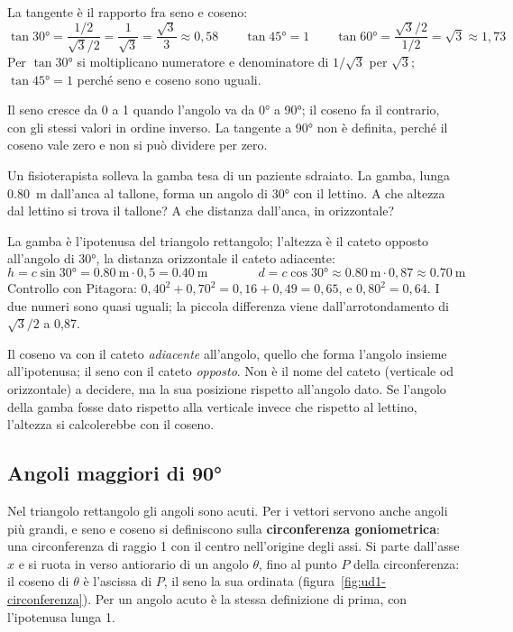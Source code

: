 La tangente è il rapporto fra seno e coseno:
\[
  \tan\ang{30} = \frac{1/2}{\sqrt 3/2} = \frac{1}{\sqrt 3} = \frac{\sqrt 3}{3} \approx 0{,}58
  \qquad
  \tan\ang{45} = 1
  \qquad
  \tan\ang{60} = \frac{\sqrt 3/2}{1/2} = \sqrt 3 \approx 1{,}73
\]
Per $\tan\ang{30}$ si moltiplicano numeratore e denominatore di $1/\sqrt 3$ per $\sqrt 3$; $\tan\ang{45} = 1$ perché seno e coseno sono uguali.

Il seno cresce da 0 a 1 quando l'angolo va da \ang{0} a \ang{90}; il coseno fa il contrario, con gli stessi valori in ordine inverso. La tangente a \ang{90} non è definita, perché il coseno vale zero e non si può dividere per zero.

\begin{esempio}
Un fisioterapista solleva la gamba tesa di un paziente sdraiato. La gamba, lunga \SI{0,80}{\metre} dall'anca al tallone, forma un angolo di \ang{30} con il lettino. A che altezza dal lettino si trova il tallone? A che distanza dall'anca, in orizzontale?

La gamba è l'ipotenusa del triangolo rettangolo; l'altezza è il cateto opposto all'angolo di \ang{30}, la distanza orizzontale il cateto adiacente:
\[
  h = c \sin\ang{30} = \SI{0,80}{\metre} \cdot 0{,}5 = \SI{0,40}{\metre}
  \qquad\qquad
  d = c \cos\ang{30} \approx \SI{0,80}{\metre} \cdot 0{,}87 \approx \SI{0,70}{\metre}
\]
Controllo con Pitagora: $0{,}40^{2} + 0{,}70^{2} = 0{,}16 + 0{,}49 = 0{,}65$, e $0{,}80^{2} = 0{,}64$. I due numeri sono quasi uguali; la piccola differenza viene dall'arrotondamento di $\sqrt 3/2$ a 0,87.
\end{esempio}

\begin{attenzione}
Il coseno va con il cateto \emph{adiacente} all'angolo, quello che forma l'angolo insieme all'ipotenusa; il seno con il cateto \emph{opposto}. Non è il nome del cateto (verticale od orizzontale) a decidere, ma la sua posizione rispetto all'angolo dato. Se l'angolo della gamba fosse dato rispetto alla verticale invece che rispetto al lettino, l'altezza si calcolerebbe con il coseno.
\end{attenzione}



\subsection{Angoli maggiori di \texorpdfstring{\ang{90}}{90 gradi}}

Nel triangolo rettangolo gli angoli sono acuti. Per i vettori servono anche angoli più grandi, e seno e coseno si definiscono sulla \textbf{circonferenza goniometrica}: una circonferenza di raggio 1 con il centro nell'origine degli assi. Si parte dall'asse $x$ e si ruota in verso antiorario di un angolo $\theta$, fino al punto $P$ della circonferenza: il coseno di $\theta$ è l'ascissa di $P$, il seno la sua ordinata (figura~\ref{fig:ud1-circonferenza}). Per un angolo acuto è la stessa definizione di prima, con l'ipotenusa lunga 1.

